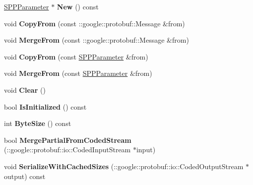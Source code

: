 \begin{DoxyCompactItemize}
\mbox{\hyperlink{classcaffe_1_1_s_p_p_parameter}{S\+P\+P\+Parameter}} $\ast$ {\bfseries New} () const
\item 
\mbox{\label{classcaffe_1_1_s_p_p_parameter_a45083388eb4aa46c25c00a9a154d709f}} 
void {\bfseries Copy\+From} (const \+::google\+::protobuf\+::\+Message \&from)
\item 
\mbox{\label{classcaffe_1_1_s_p_p_parameter_a23edb5b9dab3340984a797752f4fef97}} 
void {\bfseries Merge\+From} (const \+::google\+::protobuf\+::\+Message \&from)
\item 
\mbox{\label{classcaffe_1_1_s_p_p_parameter_aaee0955c70e91973653f7488fb3508b6}} 
void {\bfseries Copy\+From} (const \mbox{\hyperlink{classcaffe_1_1_s_p_p_parameter}{S\+P\+P\+Parameter}} \&from)
\item 
\mbox{\label{classcaffe_1_1_s_p_p_parameter_a08507b17964f3e671e1385b9d75dc320}} 
void {\bfseries Merge\+From} (const \mbox{\hyperlink{classcaffe_1_1_s_p_p_parameter}{S\+P\+P\+Parameter}} \&from)
\item 
\mbox{\label{classcaffe_1_1_s_p_p_parameter_a7aede8a03e0e699d94c6f0668d7834b3}} 
void {\bfseries Clear} ()
\item 
\mbox{\label{classcaffe_1_1_s_p_p_parameter_a6597373a482c42230e975924cbcac1e0}} 
bool {\bfseries Is\+Initialized} () const
\item 
\mbox{\label{classcaffe_1_1_s_p_p_parameter_a92c93354093a1d092e27dc6b864abb1a}} 
int {\bfseries Byte\+Size} () const
\item 
\mbox{\label{classcaffe_1_1_s_p_p_parameter_aee6ad46d8a0449ee886cbe23464c4d5a}} 
bool {\bfseries Merge\+Partial\+From\+Coded\+Stream} (\+::google\+::protobuf\+::io\+::\+Coded\+Input\+Stream $\ast$input)
\item 
\mbox{\label{classcaffe_1_1_s_p_p_parameter_ae67c9836ff2c45aa7748b3cc7d6e6778}} 
void {\bfseries Serialize\+With\+Cached\+Sizes} (\+::google\+::protobuf\+::io\+::\+Coded\+Output\+Stream $\ast$output) const

\end{DoxyCompactItemize}
